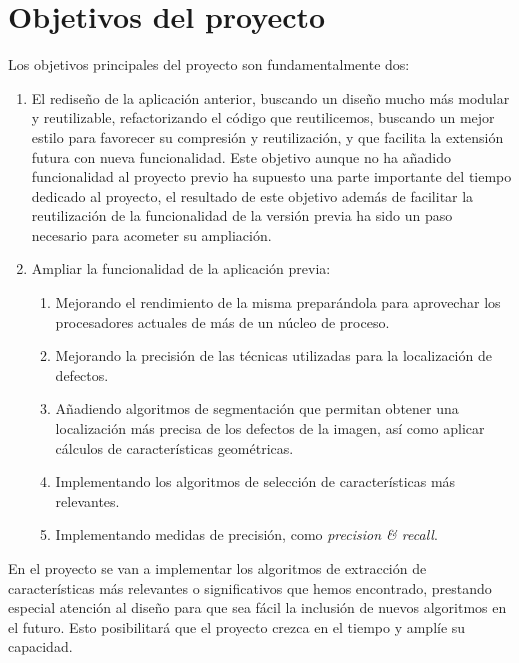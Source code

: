 \chapter{Objetivos del proyecto}

Los objetivos principales del proyecto son fundamentalmente dos:
\begin{enumerate}
 \item El rediseño de la aplicación anterior, buscando un diseño mucho más modular y reutilizable, refactorizando el código que reutilicemos, buscando un mejor estilo para favorecer su compresión y reutilización, y que facilita la extensión futura con nueva funcionalidad. Este objetivo aunque no ha añadido funcionalidad al proyecto previo ha supuesto una parte importante del tiempo dedicado al proyecto, el resultado de este objetivo además de facilitar la reutilización de la funcionalidad de la versión previa ha sido un paso necesario para acometer su ampliación.
 \item Ampliar la funcionalidad de la aplicación previa:
 \begin{enumerate}
 	\item Mejorando el rendimiento de la misma preparándola para aprovechar los procesadores actuales de más de un núcleo de proceso.
	\item Mejorando la precisión de las técnicas utilizadas para la localización de defectos.
	\item Añadiendo algoritmos de segmentación que permitan obtener una localización más precisa de los defectos de la imagen, así como aplicar cálculos de características geométricas.
	\item Implementando los algoritmos de selección de características más relevantes.
	\item Implementando medidas de precisión, como \textit{precision \& recall}.
 \end{enumerate}
	
\end{enumerate}

En el proyecto se van a implementar los algoritmos de extracción de características más relevantes o significativos que hemos encontrado, prestando especial atención al diseño para que sea fácil la inclusión de nuevos algoritmos en el futuro. Esto posibilitará que el proyecto crezca en el tiempo y amplíe su capacidad.

